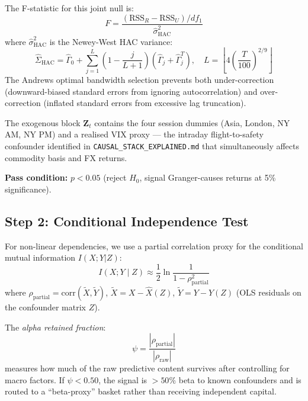 \documentclass[12pt,a4paper]{article}
\begin{document}
The F-statistic for this joint null is:
\begin{equation}
  F = \frac{(\text{RSS}_R - \text{RSS}_U)/df_1}{\hat{\sigma}^2_{\text{HAC}}}
  \label{eq:fstat}
\end{equation}
where $\hat{\sigma}^2_{\text{HAC}}$ is the Newey-West \citeyearpar{newey1987} HAC variance:
\begin{equation}
  \hat{\Sigma}_{\text{HAC}} = \hat{\Gamma}_0 + \sum_{j=1}^{L}\left(1 - \frac{j}{L+1}\right)\left(\hat{\Gamma}_j + \hat{\Gamma}_j^T\right),
  \quad L = \left\lfloor 4\!\left(\frac{T}{100}\right)^{2/9}\right\rfloor
  \label{eq:hac}
\end{equation}
The Andrews \citeyearpar{andrews1991} optimal bandwidth selection prevents both under-correction (downward-biased standard errors from ignoring autocorrelation) and over-correction (inflated standard errors from excessive lag truncation).

The exogenous block $\mathbf{Z}_t$ contains the four session dummies (Asia, London, NY AM, NY PM) and a realised VIX proxy — the intraday flight-to-safety confounder identified in \texttt{CAUSAL\_STACK\_EXPLAINED.md} that simultaneously affects commodity basis and FX returns.

\textbf{Pass condition:} $p < 0.05$ (reject $H_0$, signal Granger-causes returns at 5\% significance).

\subsection{Step 2: Conditional Independence Test}

For non-linear dependencies, we use a partial correlation proxy for the conditional mutual information $I(X; Y | Z)$:
\begin{equation}
  I(X; Y \mid Z) \approx \frac{1}{2}\ln\frac{1}{1 - \rho_{\text{partial}}^2}
  \label{eq:cmi}
\end{equation}
where $\rho_{\text{partial}} = \text{corr}(\tilde{X}, \tilde{Y})$, $\tilde{X} = X - \hat{X}(Z)$, $\tilde{Y} = Y - \hat{Y}(Z)$ (OLS residuals on the confounder matrix $Z$).

The \emph{alpha retained fraction}:
\begin{equation}
  \psi = \frac{|\rho_{\text{partial}}|}{|\rho_{\text{raw}}|}
  \label{eq:retention}
\end{equation}
measures how much of the raw predictive content survives after controlling for macro factors. If $\psi < 0.50$, the signal is $> 50\%$ beta to known confounders and is routed to a ``beta-proxy'' basket rather than receiving independent capital.
\end{document}
